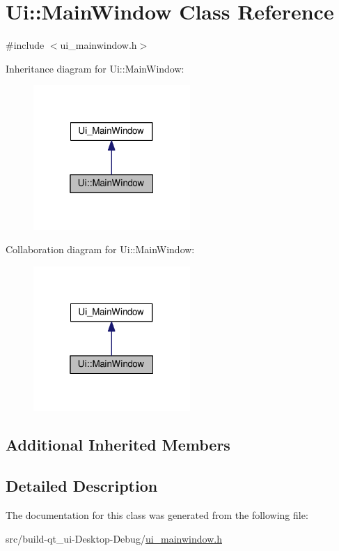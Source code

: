 \hypertarget{class_ui_1_1_main_window}{}\section{Ui\+:\+:Main\+Window Class Reference}
\label{class_ui_1_1_main_window}


{\ttfamily \#include $<$ui\+\_\+mainwindow.\+h$>$}



Inheritance diagram for Ui\+:\+:Main\+Window\+:\nopagebreak
\begin{figure}[H]
\begin{center}
\leavevmode
\includegraphics[width=169pt]{class_ui_1_1_main_window__inherit__graph}
\end{center}
\end{figure}


Collaboration diagram for Ui\+:\+:Main\+Window\+:\nopagebreak
\begin{figure}[H]
\begin{center}
\leavevmode
\includegraphics[width=169pt]{class_ui_1_1_main_window__coll__graph}
\end{center}
\end{figure}
\subsection*{Additional Inherited Members}


\subsection{Detailed Description}


The documentation for this class was generated from the following file\+:\begin{DoxyCompactItemize}
\item 
src/build-\/qt\+\_\+ui-\/\+Desktop-\/\+Debug/\hyperlink{ui__mainwindow_8h}{ui\+\_\+mainwindow.\+h}\end{DoxyCompactItemize}
